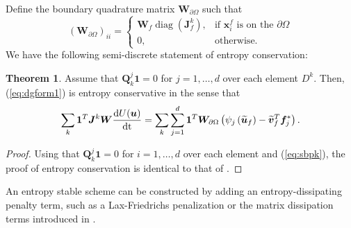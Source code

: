 \documentclass[preprint,10pt]{article}
\theoremstyle{definition}
\theoremstyle{lemma}
\theoremstyle{theorem}
\newtheorem{theorem}{Theorem}
\theoremstyle{assumption}
\DeclareMathOperator{\diag}{diag}
\renewcommand{\tilde}{\widetilde}
\newcommand{\td}[2]{\frac{{\rm d}#1}{{\rm d}{\rm #2}}}
\newcommand{\pd}[2]{\frac{\partial#1}{\partial#2}}
\newcommand{\LRp}[1]{\left( #1 \right)}
\newcommand{\LRs}[1]{\left[ #1 \right]}
\newcommand{\note}[1]{{\color{blue}{#1}}}
\begin{document}
{Define the boundary quadrature matrix $\bm{W}_{\partial \Omega}$ such that
\[
\LRp{\bm{W}_{\partial \Omega} }_{ii} = \begin{cases}
\bm{W}_f\diag\LRp{\bm{J}^k_f}, & \text{if $\bm{x}^f_i$ is on the $\partial \Omega$}\\
0, & \text{otherwise}. 
\end{cases}
\]
We have the following semi-discrete statement of entropy conservation:
\begin{theorem}
Assume that $\bm{Q}^j_k\bm{1} = 0$ for $j = 1,\ldots,d$ over each element $D^k$.  Then, (\ref{eq:dgform1}) is entropy conservative in the sense that
\[
\sum_k \bm{1}^T\bm{J}^k\bm{W}\td{U(\bm{u})}{t} = \sum_k \sum_{j=1}^d \bm{1}^T\bm{W}_{\partial \Omega} \LRp{\psi_j\LRp{\tilde{\bm{u}}_f}-\tilde{\bm{v}}_f^T\bm{f}_j^*}.
\]
\label{thm:stab1}
\end{theorem}
\begin{proof}
Using that $\bm{Q}^j_k\bm{1} = 0$ for $i = 1,\ldots,d$ over each element and (\ref{eq:sbpk}), the proof of entropy conservation is identical to that of \cite{chan2017discretely}.  
\end{proof}
An entropy stable scheme can be constructed by adding an entropy-dissipating penalty term, such as a Lax-Friedrichs penalization or the matrix dissipation terms introduced in \cite{chandrashekar2013kinetic, winters2017uniquely}.  
\note{maybe add more here?}

}
\end{document}
